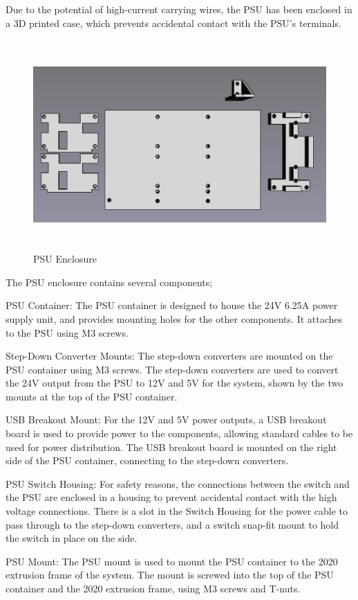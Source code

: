 Due to the potential of high-current carrying wires, the PSU has been enclosed in a 3D printed case, which prevents accidental contact with the PSU's terminals.

\begin{figure}[H]
    \begin{minipage}[h]{0.95\textwidth}
        \centering
        \includegraphics[height=8cm]{imgs/freecad/psu_mount.jpg}
        \caption{PSU Enclosure}
    \end{minipage}
\end{figure}

The PSU enclosure contains several components;
\begin{mylist}
    \item PSU Container: The PSU container is designed to house the 24V 6.25A power supply unit, and provides mounting holes for the other components. It attaches to the PSU using M3 screws.
    \item Step-Down Converter Mounts: The step-down converters are mounted on the PSU container using M3 screws. The step-down converters are used to convert the 24V output from the PSU to 12V and 5V for the system, shown by the two mounts at the top of the PSU container.
    \item USB Breakout Mount: For the 12V and 5V power outputs, a USB breakout board is used to provide power to the components, allowing standard cables to be used for power distribution. The USB breakout board is mounted on the right side of the PSU container, connecting to the step-down converters.
    \item PSU Switch Housing: For safety reasons, the connections between the switch and the PSU are enclosed in a housing to prevent accidental contact with the high voltage connections. There is a slot in the Switch Housing for the power cable to pass through to the step-down converters, and a switch snap-fit mount to hold the switch in place on the side.
    \item PSU Mount: The PSU mount is used to mount the PSU container to the 2020 extrusion frame of the system. The mount is screwed into the top of the PSU container and the 2020 extrusion frame, using M3 screws and T-nuts.
\end{mylist}

